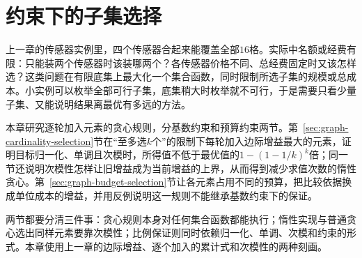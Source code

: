 \chapter{约束下的子集选择}
\label{chap:constrained-subset-selection}

上一章的传感器实例里，四个传感器合起来能覆盖全部$16$格。实际中名额或经费有限：只能装两个传感器时该装哪两个？各传感器价格不同、总经费固定时又该怎样选？这类问题在有限底集上最大化一个集合函数，同时限制所选子集的规模或总成本。小实例可以枚举全部可行子集，底集稍大时枚举就不可行，于是需要只看少量子集、又能说明结果离最优有多远的方法。

本章研究逐轮加入元素的贪心规则，分基数约束和预算约束两节。第~\ref{sec:graph-cardinality-selection}节在“至多选$k$个”的限制下每轮加入边际增益最大的元素，证明目标归一化、单调且次模时，所得值不低于最优值的$1-(1-1/k)^k$倍；同一节还说明次模性怎样让旧增益成为当前增益的上界，从而得到减少求值次数的惰性贪心。第~\ref{sec:graph-budget-selection}节让各元素占用不同的预算，把比较依据换成单位成本的增益，并用反例说明这一规则不能继承基数约束下的保证。

两节都要分清三件事：贪心规则本身对任何集合函数都能执行；惰性实现与普通贪心选出同样元素要靠次模性；比例保证则同时依赖归一化、单调、次模和约束的形式。本章使用上一章的边际增益、逐个加入的累计式和次模性的两种刻画。




